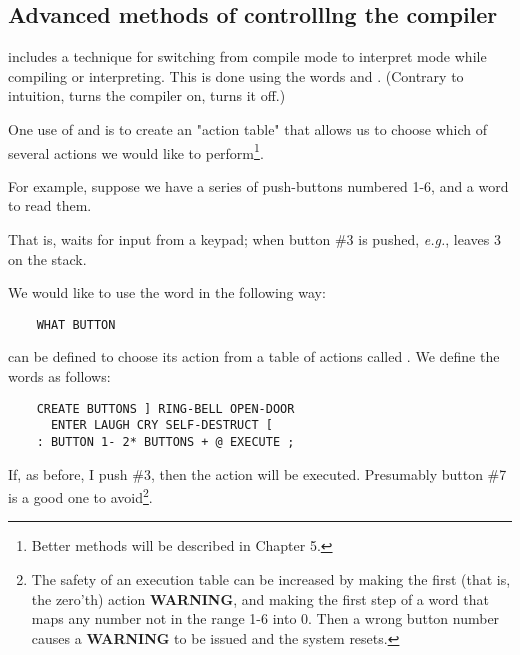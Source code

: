 \subsection{Advanced methods of controlllng the compiler}

 includes a technique for switching from compile mode to interpret mode while compiling or interpreting. This is done using the words \bc{]} and \bc{[} . (Contrary to intuition, \bc{]} turns the compiler on, \bc{[} turns it off.)

One use of \bc{]} and \bc{[} is to create an "action table" that allows us to choose which of several actions we would like to perform\footnote{Better methods will be described in Chapter 5.}.

For example, suppose we have a series of push-buttons numbered 1-6, and a word  to read them.

That is,  waits for input from a keypad; when button \#3 is pushed, \textit{e.g.},  leaves 3 on the stack.

We would like to use the word  in the following way:

\begin{lstlisting}
    WHAT BUTTON
\end{lstlisting}

 can be defined to choose its action from a table of
actions called  . We define the words as follows:

\begin{lstlisting}
    CREATE BUTTONS ] RING-BELL OPEN-DOOR
      ENTER LAUGH CRY SELF-DESTRUCT [
    : BUTTON 1- 2* BUTTONS + @ EXECUTE ;
\end{lstlisting}

If, as before, I push \#3, then the action  will be executed. Presumably button \#7 is a good one to avoid\footnote{The safety of an execution table can be increased by making the first (that is, the zero’th) action \textbf{WARNING}, and making the first step of  a word  that maps any number not in the range 1-6 into 0. Then a wrong button number causes a \textbf{WARNING} to be issued and the system resets.}.

